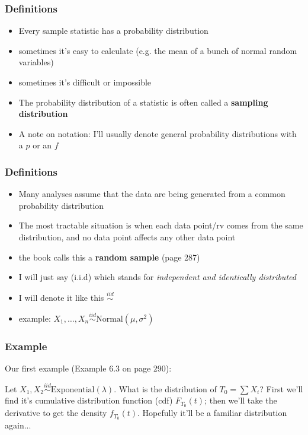 \documentclass{beamer}
\begin{document}
\begin{frame}
\frametitle{Definitions}
\begin{itemize}
\item Every sample statistic has a probability distribution
\item sometimes it's easy to calculate (e.g. the mean of a bunch of normal random variables)
\item sometimes it's difficult or impossible
\item The probability distribution of a statistic is often called a \textbf{sampling distribution}
\item A note on notation: I'll usually denote general probability distributions with a $p$ or an $f$
\end{itemize}

\end{frame}


\begin{frame}
\frametitle{Definitions}
\begin{itemize}
\item Many analyses assume that the data are being generated from a common probability distribution
\item The most tractable situation is when each data point/rv comes from the same distribution, and no data point affects any other data point 
\item the book calls this a \textbf{random sample} (page 287)
\item I will just say (i.i.d) which stands for \emph{independent and identically distributed}
\item I will denote it like this $\overset{iid}{\sim} $
\item example: $X_1, \ldots, X_n \overset{iid}{\sim} \text{Normal}(\mu,\sigma^2)$
\end{itemize}

\end{frame}


\begin{frame}
\frametitle{Example}

Our first example (Example 6.3 on page 290):
\newline

Let $X_1, X_2 \overset{iid}{\sim} \text{Exponential}(\lambda)$. What is the distribution of $T_0 = \sum X_i$? First we'll find it's cumulative distribution function (cdf) $F_{T_0}(t)$; then we'll take the derivative to get the density $f_{T_0}(t)$. Hopefully it'll be a familiar distribution again...


\end{frame}
\end{document}
